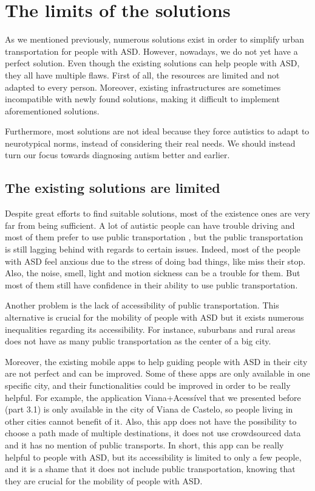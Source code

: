 \section{The limits of the solutions}

As we mentioned previously, numerous solutions exist in order to simplify urban transportation for people with ASD. However, nowadays, we do not yet have a perfect solution. Even though the existing solutions can help people with ASD, they all have multiple flaws. First of all, the resources are limited and not adapted to every person. Moreover, existing infrastructures are sometimes incompatible with newly found solutions, making it difficult to implement aforementioned solutions.

Furthermore, most solutions are not ideal because they force autistics to adapt to neurotypical norms, instead of considering their real needs. We should instead turn our focus towards diagnosing autism better and earlier.

\subsection{The existing solutions are limited}
Despite great efforts to find suitable solutions, most of the existence ones are very far from being sufficient. A lot of autistic people can have trouble driving and most of them prefer to use public transportation \cite{2015ViewpointsAdultsAutism} \cite{2021DevelopingCommunityMobility}, but the public transportation is still lagging behind with regards to certain issues. Indeed, most of the people with ASD feel anxious due to the stress of doing bad things, like miss their stop. Also, the noise, smell, light and motion sickness can be a trouble for them. But most of them still have confidence in their ability to use public transportation.\cite{2020ExperiencesYoungAutistic}

Another problem  is the lack of accessibility of public transportation. This alternative is crucial for the mobility of people with ASD but it exists numerous inequalities regarding its accessibility. For instance, suburbans and rural areas does not have as many public transportation as the center of a big city.\cite{2015DetourRightPlace}

Moreover, the existing mobile apps to help guiding people with ASD in their city are not perfect and can be improved. Some of these apps are only available in one specific city, and their functionalities could be improved in order to be really helpful. For example, the application Viana+Acessível that we presented before (part 3.1) is only available in the city of Viana de Castelo, so people living in other cities cannot benefit of it. Also, this app does not have the possibility to choose a path made of multiple destinations, it does not use crowdsourced data and it has no mention of public transports. In short, this app can be really helpful to people with ASD, but its accessibility is limited to only a few people, and it is a shame that it does not include public transportation, knowing that they are crucial for the mobility of people with ASD.\cite{2023AccessibilityStrategiesPromote}  

